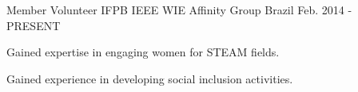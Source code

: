 \begin{cventries}
  \cventry
    {Member Volunteer} %
    {IFPB IEEE WIE Affinity Group} %
    {Brazil} %
    {Feb. 2014 - PRESENT} %
    {
      \begin{cvitems} %
        \item {Gained expertise in engaging women for STEAM fields.}
        \item {Gained experience in developing social inclusion activities.}
      \end{cvitems}
    }

\end{cventries}
